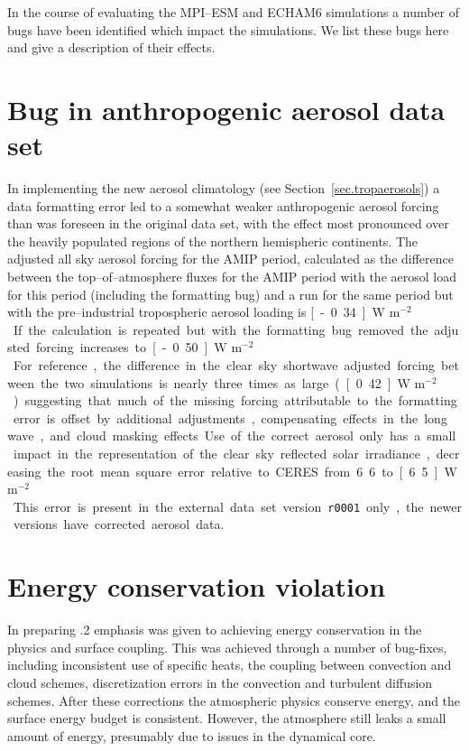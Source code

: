 In the course of evaluating the MPI--ESM and ECHAM6 simulations
a number of  bugs have been identified which impact the
simulations. We list these bugs here and give a description of their
effects.

\section{Bug in anthropogenic aerosol data set}
In implementing the new aerosol climatology (see
Section~\ref{sec.tropaerosols}) a data formatting error
led to a somewhat weaker anthropogenic aerosol forcing than was
foreseen in the original data set, with the effect most pronounced
over the heavily populated regions of the northern hemispheric
continents. The adjusted all sky aerosol forcing for the AMIP
period, calculated as the difference between the top--of--atmosphere
fluxes for the AMIP period with the aerosol load for this period
(including the formatting bug) and a run for the same period but with
the pre--industrial tropospheric aerosol loading is \unit[-0.34]{W
  m$^{-2}$}.  If the calculation is repeated but with the formatting
bug removed the adjusted forcing increases to \unit[-0.50]{W
  m$^{-2}$}.  For reference, the difference in the clear sky shortwave
adjusted forcing between the two simulations is nearly three times as
large (\unit[0.42]{W m$^{-2}$} ) suggesting that much of the missing
forcing attributable to the formatting error is offset by additional
adjustments, compensating effects in the long wave, and cloud masking
effects. Use of the correct aerosol only has a small impact in the
representation of the clear sky reflected solar irradiance, decreasing
the root mean square error relative to CERES from 6.6 to \unit[6.5]{W
  m$^{-2}$}. This error is present in the external data set version
{\tt r0001} only, the newer versions have corrected aerosol data.

\section{Energy conservation violation}
In preparing \echam.2 emphasis was given to achieving energy
conservation in the physics and surface coupling. This was achieved
through a number of bug-fixes, including inconsistent use of specific
heats, the coupling between convection and cloud schemes,
discretization errors in the convection and turbulent diffusion
schemes. After these corrections the atmospheric physics conserve
energy, and the surface energy budget is consistent. However, the
atmosphere still leaks a small amount of energy, presumably due to
issues in the dynamical core.  

